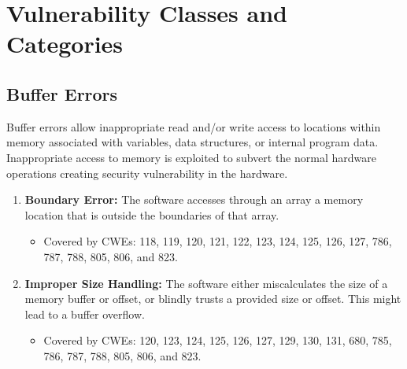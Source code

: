 \documentclass{article}
\begin{document}
\section{Vulnerability Classes and Categories}
\label{sec:classes}

\subsection{Buffer Errors}
Buffer errors allow inappropriate read and/or write access to locations within memory associated with variables, data structures, or internal program data. Inappropriate access to memory is exploited to subvert the normal hardware operations creating security vulnerability in the hardware.
\begin{enumerate}
    \item \textbf{Boundary Error:} The software accesses through an array a memory location that is outside the boundaries of that array.
    \begin{itemize}
        \item Covered by CWEs: 118, 119, 120, 121, 122, 123, 124, 125, 126, 127, 786, 787, 788, 805, 806, and 823.
    \end{itemize}
    
    \item \textbf{Improper Size Handling:} The software either miscalculates the size of a memory buffer or offset, or blindly trusts a provided size or offset. This might lead to a buffer overflow.
    \begin{itemize}
        \item Covered by CWEs: 120, 123, 124, 125, 126, 127, 129, 130, 131, 680, 785, 786, 787, 788, 805, 806, and 823.
    \end{itemize}
\end{enumerate}
\end{document}
